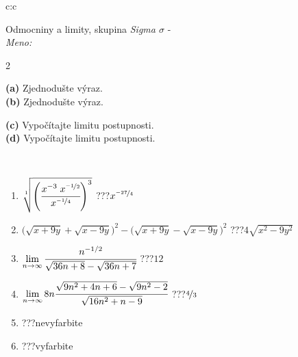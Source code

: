 \documentclass[10pt]{report}
\begin{document}
\begin{tabular}{c:c}
\begin{minipage}[c][104.5mm][t]{0.5\linewidth}
\begin{center}
\vspace{7mm}
{\huge Odmocniny a limity, skupina \textit{Sigma $\sigma$} -}\\[5mm]
\textit{Meno:}\phantom{xxxxxxxxxxxxxxxxxxxxxxxxxxxxxxxxxxxxxxxxxxxxxxxxxxxxxxxxxxxxxxxxx}\\[5mm]
\begin{minipage}{0.95\linewidth}
\begin{center}
{\small \begin{multicols}{2} \raggedright
\textbf{(a)} Zjednodušte výraz. \\[1mm]
\textbf{(b)} Zjednodušte výraz. \par \columnbreak
\textbf{(c)} Vypočítajte limitu postupnosti. \\[1mm]
\textbf{(d)} Vypočítajte limitu postupnosti.
\end{multicols}
}
\end{center}
\end{minipage}
\\[4mm]
\begin{minipage}{0.79\linewidth}
\begin{center}
\begin{varwidth}{\linewidth}
\begin{enumerate}
\small
\item $\sqrt[1]{\left(\cfrac{x^{-3}\;x^{\nicefrac{-1}{2}}}{x^{\nicefrac{-1}{4}}}\right)^{3}}$\quad \dotfill\; ???\;\dotfill \quad $x^{\nicefrac{-27}{4}}$
\item {\footnotesize{\scriptsize$\big(\sqrt{x+9y}+\sqrt{x-9y}\big)^2-\big(\sqrt{x+9y}-\sqrt{x-9y}\big)^2$}\quad \dotfill\; ???\;\dotfill \quad $4\sqrt{x^2-9y^2}$}
\item $\lim\limits_{n\to\infty}\cfrac{n^{-1/2}}{\sqrt{36n+8}-\sqrt{36n+7}}$\quad \dotfill\; ???\;\dotfill \quad $12$
\item $\lim\limits_{n\to\infty}8n\cfrac{\sqrt{9n^2+4n+6}-\sqrt{9n^2-2}}{\sqrt{16n^2+n-9}}$\quad \dotfill\; ???\;\dotfill \quad $\nicefrac{4}{3}$
\item \quad \dotfill\; ???\;\dotfill \quad nevyfarbite
\item \quad \dotfill\; ???\;\dotfill \quad vyfarbite
\end{enumerate}
\end{varwidth}
\end{center}

\end{minipage}
\end{center}
\end{minipage}
\end{tabular}
\end{document}
